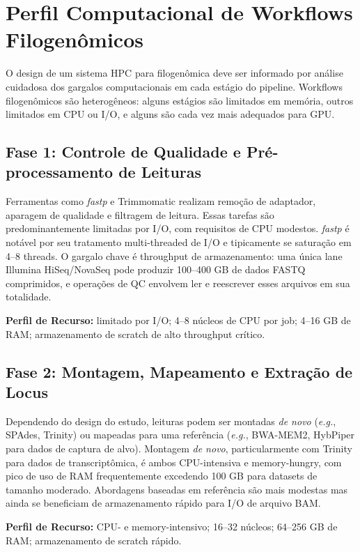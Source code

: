 \section{Perfil Computacional de Workflows Filogenômicos}

O design de um sistema HPC para filogenômica deve ser informado por análise cuidadosa dos gargalos computacionais em cada estágio do pipeline. Workflows filogenômicos são heterogêneos: alguns estágios são limitados em memória, outros limitados em CPU ou I/O, e alguns são cada vez mais adequados para GPU.

\subsection{Fase 1: Controle de Qualidade e Pré-processamento de Leituras}

Ferramentas como \textit{fastp} \parencite{chen2018} e Trimmomatic \parencite{bolger2014} realizam remoção de adaptador, aparagem de qualidade e filtragem de leitura. Essas tarefas são predominantemente limitadas por I/O, com requisitos de CPU modestos. \textit{fastp} é notável por seu tratamento multi-threaded de I/O e tipicamente se saturação em 4--8 threads. O gargalo chave é throughput de armazenamento: uma única lane Illumina HiSeq/NovaSeq pode produzir 100--400 GB de dados FASTQ comprimidos, e operações de QC envolvem ler e reescrever esses arquivos em sua totalidade.

\textbf{Perfil de Recurso:} limitado por I/O; 4--8 núcleos de CPU por job; 4--16 GB de RAM; armazenamento de scratch de alto throughput crítico.

\subsection{Fase 2: Montagem, Mapeamento e Extração de Locus}

Dependendo do design do estudo, leituras podem ser montadas \textit{de novo} (\textit{e.g.}, SPAdes, Trinity) ou mapeadas para uma referência (\textit{e.g.}, BWA-MEM2, HybPiper para dados de captura de alvo). Montagem \textit{de novo}, particularmente com Trinity para dados de transcriptômica, é ambos CPU-intensiva e memory-hungry, com pico de uso de RAM frequentemente excedendo 100 GB para datasets de tamanho moderado. Abordagens baseadas em referência são mais modestas mas ainda se beneficiam de armazenamento rápido para I/O de arquivo BAM.

\textbf{Perfil de Recurso:} CPU- e memory-intensivo; 16--32 núcleos; 64--256 GB de RAM; armazenamento de scratch rápido.

